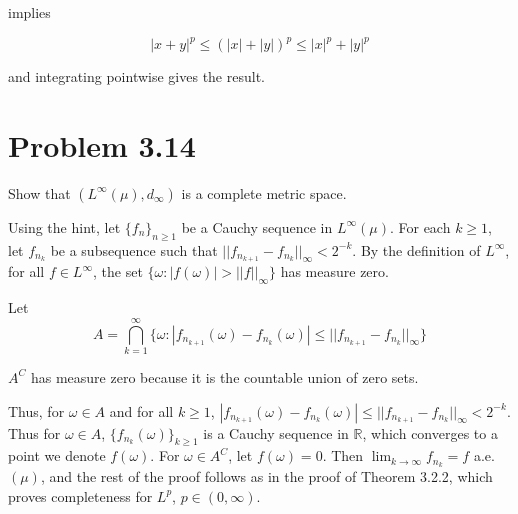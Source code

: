 \documentclass{article}
\newcommand{\R}{\mathbb{R}}
\begin{document}
implies

\[
|x+y|^p \leq (|x|+|y|)^p \leq |x|^p + |y|^p
\]

and integrating pointwise gives the result.

\section*{Problem 3.14}

Show that $(L^\infty(\mu), d_\infty)$ is a complete metric space.

Using the hint, let $\{f_n\}_{n \geq 1}$ be a Cauchy sequence in $L^\infty(\mu)$. For each $k \geq 1$, let $f_{n_k}$ be a subsequence such that $||f_{n_{k+1}} - f_{n_k}||_\infty < 2^{-k}$. By the definition of $L^\infty$, for all $f \in L^\infty$, the set $\{\omega: |f(\omega)| > ||f||_\infty\}$ has measure zero.

Let
\[
A = \bigcap_{k=1}^\infty\{ \omega: |f_{n_{k+1}}(\omega) - f_{n_k}(\omega)| \leq ||f_{n_{k+1}} - f_{n_k}||_\infty \}
\]

$A^C$ has measure zero because it is the countable union of zero sets.

Thus, for $\omega \in A$ and for all $k \geq 1$, $|f_{n_{k+1}}(\omega) - f_{n_k}(\omega)| \leq ||f_{n_{k+1}} - f_{n_k}||_\infty < 2^{-k}$. Thus for $\omega \in A$, $\{f_{n_k}(\omega)\}_{k \geq 1}$ is a Cauchy sequence in $\R$, which converges to a point we denote $f(\omega)$. For $\omega \in A^C$, let $f(\omega) = 0$. Then $\lim_{k \rightarrow \infty} f_{n_k} = f$ a.e. $(\mu)$, and the rest of the proof follows as in the proof of Theorem 3.2.2, which proves completeness for $L^p$, $p \in (0, \infty)$.
\end{document}
